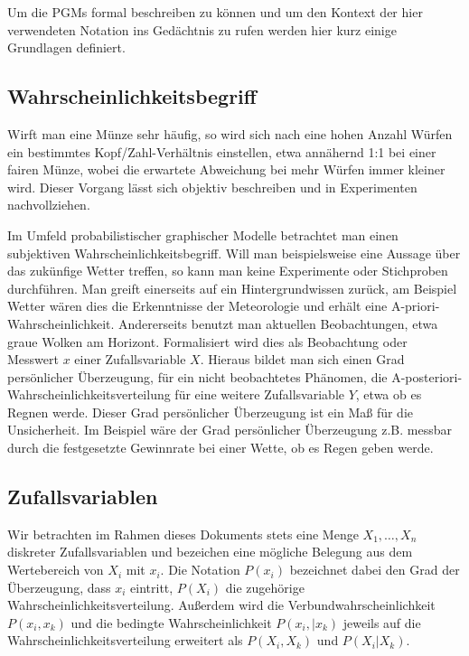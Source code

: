 \documentclass{llncs}
\begin{document}
Um die PGMs formal beschreiben zu können und um den Kontext der hier verwendeten Notation ins Gedächtnis zu rufen werden hier kurz einige Grundlagen definiert. 

\subsection{Wahrscheinlichkeitsbegriff}

Wirft man eine Münze sehr häufig, so wird sich nach eine hohen Anzahl Würfen ein bestimmtes Kopf/Zahl-Verhältnis einstellen, etwa annähernd 1:1 bei einer fairen Münze, wobei die erwartete Abweichung bei mehr Würfen immer kleiner wird. Dieser Vorgang lässt sich objektiv beschreiben und in Experimenten nachvollziehen. 

Im Umfeld probabilistischer graphischer Modelle betrachtet man einen subjektiven Wahrscheinlichkeitsbegriff\cite{simon1958elements}. Will man beispielsweise eine Aussage über das zukünfige Wetter treffen, so kann man keine Experimente oder Stichproben durchführen. Man greift einerseits auf ein Hintergrundwissen zurück, am Beispiel Wetter wären dies die Erkenntnisse der Meteorologie und erhält eine A-priori-Wahrscheinlichkeit. Andererseits benutzt man aktuellen Beobachtungen, etwa graue Wolken am Horizont. Formalisiert wird dies als Beobachtung oder Messwert $x$ einer Zufallsvariable $X$. Hieraus bildet man sich einen Grad persönlicher Überzeugung, für ein nicht beobachtetes Phänomen, die A-posteriori-Wahrscheinlichkeitsverteilung für eine weitere Zufallsvariable $Y$, etwa ob es Regnen werde. Dieser Grad persönlicher Überzeugung ist ein Maß für die Unsicherheit. Im Beispiel wäre der Grad persönlicher Überzeugung z.B. messbar durch die festgesetzte Gewinnrate bei einer Wette, ob es Regen geben werde. 

\subsection{Zufallsvariablen}

Wir betrachten im Rahmen dieses Dokuments stets eine Menge $X_1,\dots,X_n$ diskreter Zufallsvariablen und bezeichen eine mögliche Belegung aus dem Wertebereich von $X_i$ mit $x_i$. Die Notation $P(x_i)$ bezeichnet dabei den Grad der Überzeugung, dass $x_i$ eintritt, $P(X_i)$ die zugehörige Wahrscheinlichkeitsverteilung. Außerdem wird die Verbundwahrscheinlichkeit $P(x_i,x_k)$ und die bedingte Wahrscheinlichkeit $P(x_i,|x_k)$ jeweils auf die Wahrscheinlichkeitsverteilung erweitert als $P(X_i,X_k)$ und $P(X_i|X_k)$. 
\end{document}
